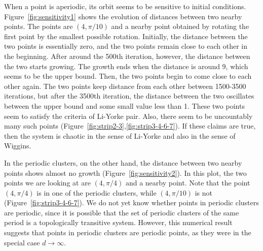 \documentclass[10pt,twoside,draft]{book}
\begin{document}
When a point is aperiodic, its orbit seems to be sensitive to initial conditions.
Figure~\ref{fig:sensitivity1} shows the evolution of distances between two nearby points.
The points are $(4,\pi/10)$ and a nearby point obtained by rotating the first point by the smallest possible rotation.
Initially, the distance between the two points is essentially zero, and the two points remain close to each other in the beginning.
After around the 500th iteration, however, the distance between the two starts growing.
The growth ends when the distance is around 9, which seems to be the upper bound.
Then, the two points begin to come close to each other again.
The two points keep distance from each other between 1500-3500 iterations, but after the 3500th iteration, the distance between the two oscillates between the upper bound and some small value less than 1.
These two points seem to satisfy the criteria of Li-Yorke pair.
Also, there seem to be uncountably many such points (Figure~\ref{fig:strip2-3},\ref{fig:strip3-4-6-7}).
If these claims are true, then the system is chaotic in the sense of Li-Yorke and also in the sense of Wiggins.

In the periodic clusters, on the other hand, the distance between two nearby points shows almost no growth (Figure~\ref{fig:sensitivity2}).
In this plot, the two points we are looking at are $(4,\pi/4)$ and a nearby point.
Note that the point $(4,\pi/4)$ is in one of the periodic clusters, while $(4,\pi/10)$ is not (Figure~\ref{fig:strip3-4-6-7}).
We do not yet know whether points in periodic clusters are periodic, since it is possible that the set of periodic clusters of the same period is a topologically transitive system.
However, this numerical result suggests that points in periodic clusters are periodic points, as they were in the special case $d \to \infty$.
\end{document}
